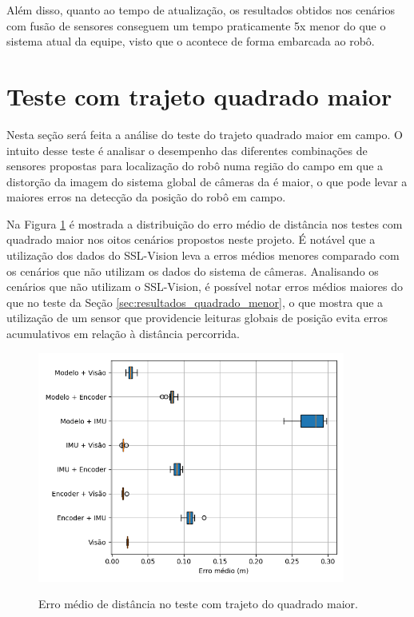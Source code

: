 \documentclass[acronym, symbols, table]{fei}
\begin{document}
	Além disso, quanto ao tempo de atualização, os resultados obtidos nos cenários com fusão de sensores conseguem um tempo praticamente 5x menor do que o sistema atual da equipe, visto que o  acontece de forma embarcada ao robô.

	\section{Teste com trajeto quadrado maior} \label{sec:resultados_quadrado_maior}
	
		Nesta seção será feita a análise do teste do trajeto quadrado maior em campo. O intuito desse teste é analisar o desempenho das diferentes combinações de sensores propostas para localização do robô numa região do campo em que a distorção da imagem do sistema global de câmeras da  é maior, o que pode levar a maiores erros na detecção da posição do robô em campo.
		
		Na Figura \ref{fig:erro_medio_distancia_quad_maior} é mostrada a distribuição do erro médio de distância nos testes com quadrado maior nos oitos cenários propostos neste projeto. É notável que a utilização dos dados do SSL-Vision leva a erros médios menores comparado com os cenários que não utilizam os dados do sistema de câmeras. Analisando os cenários que não utilizam o SSL-Vision, é possível notar erros médios maiores do que no teste da Seção \ref{sec:resultados_quadrado_menor}, o que mostra que a utilização de um sensor que providencie leituras globais de posição evita erros acumulativos em relação à distância percorrida.
		
		\begin{figure}[!htb]
			\centering
			\caption{Erro médio de distância no teste com trajeto do quadrado maior.}
			\includegraphics[width=0.9\textwidth]{../Dados/Graficos-Resultados/erro_medio_distancia_quadrado_maior.png}
			\label{fig:erro_medio_distancia_quad_maior}
		\end{figure}
	
\end{document}
